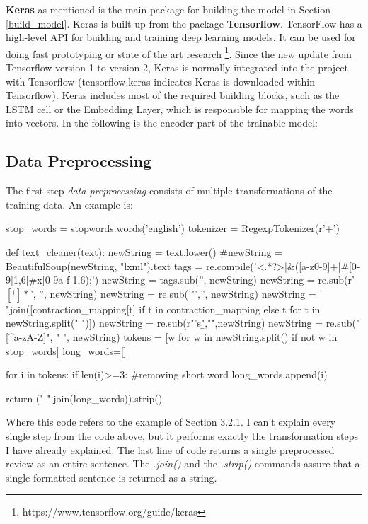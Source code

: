 \textbf{Keras} as mentioned is the main package for building the model in Section \ref{build_model}. Keras is built up from the package \textbf{Tensorflow}. TensorFlow has a high-level API for building and training deep learning models. It can be used for doing fast prototyping or state of the art research \footnote{https://www.tensorflow.org/guide/keras}. Since the new update from Tensorflow version 1 to version 2, Keras is normally integrated into the project with Tensorflow (tensorflow.keras indicates Keras is downloaded within Tensorflow). Keras includes most of the required building blocks, such as the LSTM cell or the Embedding Layer, which is responsible for mapping the words into vectors. In the following is the encoder part of the trainable model: \\ 


\subsection{Data Preprocessing}
The first step \textit{data preprocessing} consists of multiple transformations of the training data. An example is:

\begin{python}
	stop_words = stopwords.words('english')
	tokenizer = RegexpTokenizer(r'\w+')
	
	def text_cleaner(text):
	newString = text.lower()
	#newString = BeautifulSoup(newString, "lxml").text
	tags = re.compile('<.*?>|&([a-z0-9]+|#[0-9]{1,6}|#x[0-9a-f]{1,6});')
	newString = tags.sub('', newString)
	newString = re.sub(r'\([^)]*\)', '', newString)
	newString = re.sub('"','', newString)
	newString = ' '.join([contraction_mapping[t] if t in contraction_mapping else t for t in newString.split(" ")])    
	newString = re.sub(r"'s\b","",newString)
	newString = re.sub("[^a-zA-Z]", " ", newString) 
	tokens = [w for w in newString.split() if not w in stop_words]
	long_words=[]
	
	for i in tokens:
		if len(i)>=3:                  #removing short word
			long_words.append(i) 
			  
	return (" ".join(long_words)).strip()
\end{python}

Where this code refers to the example of Section 3.2.1. I can't explain every single step from the code above, but it performs exactly the transformation steps I have already explained. The last line of code returns a single preprocessed review as an entire sentence. The \textit{.join()} and the \textit{.strip()} commands assure that a single formatted sentence is returned as a string. 

